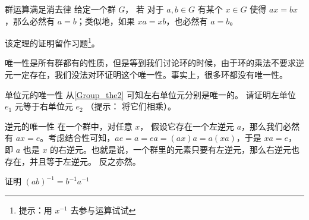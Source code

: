 \begin{theorem}{群运算满足消去律}\label{Group_the2}
给定一个群 $G$， 若 对于 $ a, b\in G$ 有某个 $x\in G$ 使得 $ax=bx$，那么必然有 $a=b$；类似地，如果 $xa=xb$，也必然有 $a=b$。
\end{theorem}

该定理的证明留作习题\footnote{提示：用 $x^{-1}$ 去参与运算试试}。

唯一性是所有群都有的性质，但是等到我们讨论环的时候，由于环的乘法不要求逆元一定存在，我们没法对环证明这个唯一性。事实上，很多环都没有唯一性。

\begin{exercise}{单位元的唯一性}
从\autoref{Group_the2} 可知左右单位元分别是唯一的。 请证明左单位 $e_1$ 元等于右单位元 $e_2$ （提示： 将它们相乘）。
\end{exercise}

\begin{theorem}{逆元的唯一性}\label{Group_the1}
在一个群中，对任意 $x$， 假设它存在一个左逆元 $a$，那么我们必然有 $ax=e$。考虑结合性可知，$ae=a=ea=(ax)a=a(xa)$，于是 $xa=e$，即 $a$ 也是 $x$ 的右逆元。也就是说，一个群里的元素只要有左逆元，那么右逆元也存在，并且等于左逆元。 反之亦然。
\end{theorem}

\begin{exercise}{}
证明 $(ab)^{-1} = b^{-1}a^{-1}$
\end{exercise}
